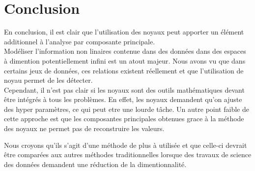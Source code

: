 \section{Conclusion}

En conclusion, il est clair que l'utilisation des noyaux peut apporter un élément additionnel à l'analyse par composante principale.\\

Modéliser l'information non linaires contenue dans des données dans des espaces à dimention potentiellement infini est un atout majeur.
Nous avons vu que dans certains jeux de données, ces relations existent réellement et que l'utilisation de noyau permet de les détecter.\\

Cependant, il n'est pas clair si les noyaux sont des outils mathématiques devant être intégrés à tous les problèmes. 
En effet, les noyaux demandent qu'on ajuste des hyper paramètres, ce qui peut etre une lourde tâche. Un autre point faible de 
cette approche est que les composantes principales obtenues grace à la méthode des noyaux ne permet pas de reconstruire les 
valeurs. 

Nous croyons qu'ils s'agit d'une méthode de plus à utilisée et que celle-ci devrait être comparées aux autres méthodes
traditionnelles lorsque des travaux de science des données demandent une réduction de la dimentionnalité.